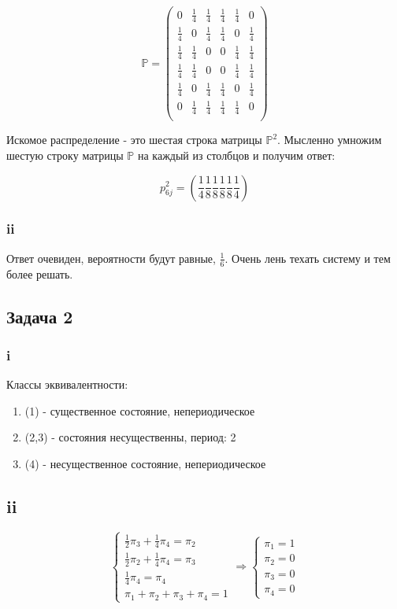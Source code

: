 \documentclass[a4paper,12pt]{article}
\def \mbb{\mathbb}
\def \P{\mbb{P}}
\begin{document}
\[ \P = \begin{pmatrix} 
0 & \frac{1}{4} & \frac{1}{4} & \frac{1}{4} & \frac{1}{4} & 0\\
\frac{1}{4} & 0 & \frac{1}{4} & \frac{1}{4} & 0 & \frac{1}{4}\\
\frac{1}{4} & \frac{1}{4} & 0 & 0 & \frac{1}{4} & \frac{1}{4}\\
\frac{1}{4} & \frac{1}{4} & 0 & 0 & \frac{1}{4} & \frac{1}{4}\\
\frac{1}{4} & 0 & \frac{1}{4} & \frac{1}{4} & 0 & \frac{1}{4}\\
0 & \frac{1}{4} & \frac{1}{4} & \frac{1}{4} & \frac{1}{4} & 0\\
\end{pmatrix} \]

Искомое распределение - это шестая строка матрицы $ \P^2 $. Мысленно умножим шестую строку матрицы $ \P $ на каждый из столбцов и получим ответ:

\[ p_{6j}^2 = \left(\frac{1}{4} \frac{1}{8} \frac{1}{8} \frac{1}{8} \frac{1}{8} \frac{1}{4} \right) \]

\subsubsection{ii}

Ответ очевиден, вероятности будут равные, $ \frac{1}{6} $. Очень лень техать систему и тем более решать. 

\subsection{Задача 2}

\subsubsection{i}

Классы эквивалентности:

\begin{enumerate}[\Sun]
	\item (1) - существенное состояние, непериодическое
	\item (2,3) - состояния несущественны, период: 2
	\item (4) - несущественное состояние, непериодическое
\end{enumerate}

\subsection{ii}
\[ 
\begin{cases}
\frac{1}{2}\pi_3 + \frac{1}{4} \pi_4 = \pi_2\\
\frac{1}{2} \pi_2 + \frac{1 }{4} \pi_4 = \pi_3\\
\frac{1}{4} \pi_4 =\pi_4\\
\pi_1 + \pi_2 + \pi_3 + \pi_4 = 1

\end{cases} \Rightarrow
\begin{cases}
\pi_1 = 1\\
\pi_2 = 0\\
\pi_3 = 0\\
\pi_4 = 0
\end{cases}
\]
\end{document}
